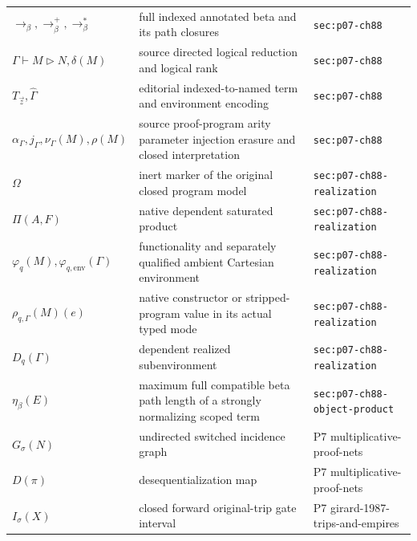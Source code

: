 \begin{longtable}{@{}p{}p{}p{}@{}}
\(\longrightarrow_\beta,\allowbreak \longrightarrow_\beta^+,\allowbreak \longrightarrow_\beta^*\) & full indexed annotated beta and its path closures & \texttt{sec:\allowbreak{}p07-\allowbreak{}ch88} \\
\(\Gamma\vdash M\mathrel{\triangleright}N,\allowbreak \delta(M)\) & source directed logical reduction and logical rank & \texttt{sec:\allowbreak{}p07-\allowbreak{}ch88} \\
\(T_{\vec z},\allowbreak \widehat\Gamma\) & editorial indexed-to-named term and environment encoding & \texttt{sec:\allowbreak{}p07-\allowbreak{}ch88} \\
\(\alpha_\Gamma,\allowbreak j_\Gamma,\allowbreak \nu_\Gamma(M),\allowbreak \rho(M)\) & source proof-program arity parameter injection erasure and closed interpretation & \texttt{sec:\allowbreak{}p07-\allowbreak{}ch88} \\
\(\Omega\) & inert marker of the original closed program model & \texttt{sec:\allowbreak{}p07-\allowbreak{}ch88-\allowbreak{}realization} \\
\(\Pi(A,\allowbreak F)\) & native dependent saturated product & \texttt{sec:\allowbreak{}p07-\allowbreak{}ch88-\allowbreak{}realization} \\
\(\varphi_q(M),\allowbreak \varphi_{q,\mathrm{env}}(\Gamma)\) & functionality and separately qualified ambient Cartesian environment & \texttt{sec:\allowbreak{}p07-\allowbreak{}ch88-\allowbreak{}realization} \\
\(\rho_{q,\Gamma}(M)(e)\) & native constructor or stripped-program value in its actual typed mode & \texttt{sec:\allowbreak{}p07-\allowbreak{}ch88-\allowbreak{}realization} \\
\(D_q(\Gamma)\) & dependent realized subenvironment & \texttt{sec:\allowbreak{}p07-\allowbreak{}ch88-\allowbreak{}realization} \\
\(\eta_\beta(E)\) & maximum full compatible beta path length of a strongly normalizing scoped term & \texttt{sec:\allowbreak{}p07-\allowbreak{}ch88-\allowbreak{}object-\allowbreak{}product} \\
\(G_\sigma(N)\) & undirected switched incidence graph & P7 multiplicative-\allowbreak{}proof-\allowbreak{}nets \\
\(D(\pi)\) & desequentialization map & P7 multiplicative-\allowbreak{}proof-\allowbreak{}nets \\
\(I_\sigma(X)\) & closed forward original-trip gate interval & P7 girard-\allowbreak{}1987-\allowbreak{}trips-\allowbreak{}and-\allowbreak{}empires \\

\end{longtable}
